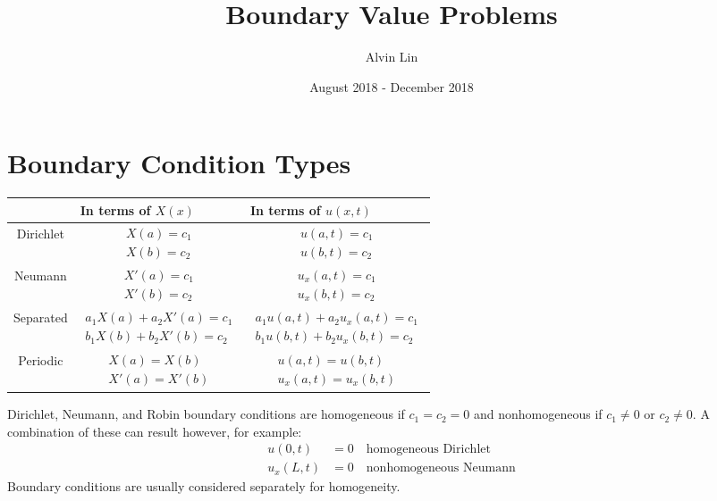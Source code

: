 \documentclass{math}
\title{Boundary Value Problems}
\author{Alvin Lin}
\date{August 2018 - December 2018}
\begin{document}
\maketitle

\section*{Boundary Condition Types}
\begin{center}
  \begin{tabular}{|c|p{4cm}|p{4cm}|}
    \hline
    & In terms of \( X(x) \) & In terms of \( u(x,t) \) \\
    \hline
    Dirichlet & \begin{align*}
      X(a) = c_1 \\
      X(b) = c_2
    \end{align*} & \begin{align*}
      u(a,t) = c_1 \\
      u(b,t) = c_2
    \end{align*} \\
    \hline
    Neumann & \begin{align*}
      X'(a) = c_1 \\
      X'(b) = c_2
    \end{align*} & \begin{align*}
      u_x(a,t) = c_1 \\
      u_x(b,t) = c_2
    \end{align*} \\
    \hline
    Separated & \begin{align*}
      a_1X(a)+a_2X'(a) = c_1 \\
      b_1X(b)+b_2X'(b) = c_2
    \end{align*} & \begin{align*}
      a_1u(a,t)+a_2u_x(a,t) = c_1 \\
      b_1u(b,t)+b_2u_x(b,t) = c_2
    \end{align*} \\
    \hline
    Periodic & \begin{align*}
      X(a) = X(b) \\
      X'(a) = X'(b)
    \end{align*} & \begin{align*}
      u(a,t) = u(b,t) \\
      u_x(a,t) = u_x(b,t)
    \end{align*} \\
    \hline
  \end{tabular}
\end{center}
Dirichlet, Neumann, and Robin boundary conditions are homogeneous if
\( c_1 = c_2 = 0 \) and nonhomogeneous if \( c_1 \ne 0 \) or \( c_2 \ne 0 \).
A combination of these can result however, for example:
\begin{align*}
  u(0,t) &= 0 \quad \text{homogeneous Dirichlet} \\
  u_x(L,t) &= 0 \quad \text{nonhomogeneous Neumann}
\end{align*}
Boundary conditions are usually considered separately for homogeneity.
\end{document}
